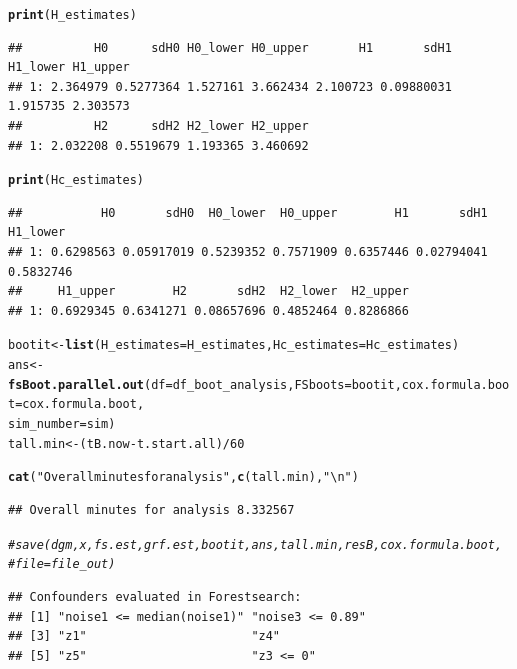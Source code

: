 \documentclass[12pt]{article}
\makeatletter
\newcommand{\hlnum}[1]{\textcolor[rgb]{0.686,0.059,0.569}{#1}}%
\newcommand{\hlstr}[1]{\textcolor[rgb]{0.192,0.494,0.8}{#1}}%
\newcommand{\hlcom}[1]{\textcolor[rgb]{0.678,0.584,0.686}{\textit{#1}}}%
\newcommand{\hlopt}[1]{\textcolor[rgb]{0,0,0}{#1}}%
\newcommand{\hlstd}[1]{\textcolor[rgb]{0.345,0.345,0.345}{#1}}%
\newcommand{\hlkwb}[1]{\textcolor[rgb]{0.69,0.353,0.396}{#1}}%
\newcommand{\hlkwc}[1]{\textcolor[rgb]{0.333,0.667,0.333}{#1}}%
\newcommand{\hlkwd}[1]{\textcolor[rgb]{0.737,0.353,0.396}{\textbf{#1}}}%
\newenvironment{kframe}{%
 \def\at@end@of@kframe{}%
 \ifinner\ifhmode%
  \def\at@end@of@kframe{\end{minipage}}%
  \begin{minipage}{\columnwidth}%
 \fi\fi%
 \def\FrameCommand##1{\hskip\@totalleftmargin \hskip-\fboxsep
 \colorbox{shadecolor}{##1}\hskip-\fboxsep
     \hskip-\linewidth \hskip-\@totalleftmargin \hskip\columnwidth}%
 \MakeFramed {\advance\hsize-\width
   \@totalleftmargin\z@ \linewidth\hsize
   \@setminipage}}%
 {\par\unskip\endMakeFramed%
 \at@end@of@kframe}
\newenvironment{knitrout}{}{} %
\makeatother
\begin{document}
\begin{knitrout}
\begin{kframe}
\begin{alltt}
\hlkwd{print}\hlstd{(H_estimates)}
\end{alltt}
\begin{verbatim}
##          H0      sdH0 H0_lower H0_upper       H1       sdH1 H1_lower H1_upper
## 1: 2.364979 0.5277364 1.527161 3.662434 2.100723 0.09880031 1.915735 2.303573
##          H2      sdH2 H2_lower H2_upper
## 1: 2.032208 0.5519679 1.193365 3.460692
\end{verbatim}
\begin{alltt}
\hlkwd{print}\hlstd{(Hc_estimates)}
\end{alltt}
\begin{verbatim}
##           H0       sdH0  H0_lower  H0_upper        H1       sdH1  H1_lower
## 1: 0.6298563 0.05917019 0.5239352 0.7571909 0.6357446 0.02794041 0.5832746
##     H1_upper        H2       sdH2  H2_lower  H2_upper
## 1: 0.6929345 0.6341271 0.08657696 0.4852464 0.8286866
\end{verbatim}
\begin{alltt}
\hlstd{bootit} \hlkwb{<-} \hlkwd{list}\hlstd{(}\hlkwc{H_estimates} \hlstd{= H_estimates,} \hlkwc{Hc_estimates} \hlstd{= Hc_estimates)}
\hlstd{ans} \hlkwb{<-} \hlkwd{fsBoot.parallel.out}\hlstd{(}\hlkwc{df} \hlstd{= df_boot_analysis,} \hlkwc{FSboots} \hlstd{= bootit,} \hlkwc{cox.formula.boot} \hlstd{= cox.formula.boot,}
    \hlkwc{sim_number} \hlstd{= sim)}
\hlstd{tall.min} \hlkwb{<-} \hlstd{(tB.now} \hlopt{-} \hlstd{t.start.all)}\hlopt{/}\hlnum{60}

\hlkwd{cat}\hlstd{(}\hlstr{"Overall minutes for analysis"}\hlstd{,} \hlkwd{c}\hlstd{(tall.min),} \hlstr{"\textbackslash{}n"}\hlstd{)}
\end{alltt}
\begin{verbatim}
## Overall minutes for analysis 8.332567
\end{verbatim}
\begin{alltt}
\hlcom{# save(dgm, x, fs.est, grf.est, bootit, ans, tall.min, resB, cox.formula.boot,}
\hlcom{# file=file_out)}
\end{alltt}
\end{kframe}
\end{knitrout}


\begin{knitrout}
\color{fgcolor}\begin{kframe}
\begin{verbatim}
## Confounders evaluated in Forestsearch:
## [1] "noise1 <= median(noise1)" "noise3 <= 0.89"          
## [3] "z1"                       "z4"                      
## [5] "z5"                       "z3 <= 0"
\end{verbatim}
\end{kframe}
\end{knitrout}
\end{document}
